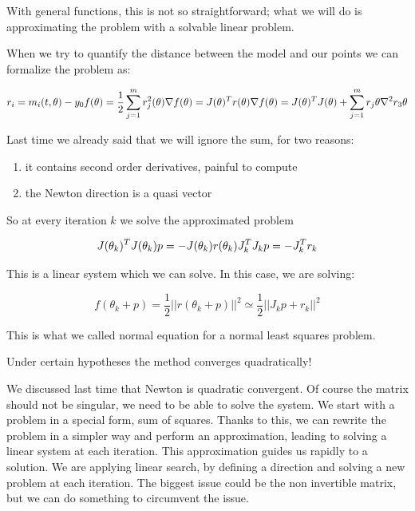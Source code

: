 With general functions, this is not so straightforward; what we will do
is approximating the problem with a solvable linear problem.


When we try to quantify the distance between the model and our points we can formalize the problem as:

$$
r_i = m_i(t,\theta) - y_0 \\ f(\theta)= \frac{1}{2} \sum^m_{j=1} r_j^2 (\theta) \\ \nabla f(\theta) = J(\theta)^{T} r (\theta) \\ \nabla f(\theta) = J(\theta)^{T} J (\theta) + \sum^m_{j=1} r_j \theta \nabla^2 r_3 \theta\\
$$

Last time we already said that we will ignore the sum, for two reasons:

\begin{enumerate}
\def\labelenumi{\arabic{enumi}.}
\tightlist
\item
  it contains second order derivatives, painful to compute
\item
  the Newton direction is a quasi vector
\end{enumerate}

So at every iteration $k$ we solve the approximated problem

$$
J(\theta_k)^TJ(\theta_k)p=-J(\theta_k)r(\theta_k) \\ J_k^TJ_kp=-J_k^T r_k
$$

This is a linear system which we can solve. In this case, we are
solving:

$$
f(\theta_k+p)= \frac{1}{2} ||r(\theta_k+p)||^2 \simeq \frac{1}{2} ||J_kp+r_k||^2
$$

This is what we called normal equation for a normal least squares
problem.

Under certain hypotheses the method converges quadratically!

We discussed last time that Newton is quadratic convergent. Of course
the matrix should not be singular, we need to be able to solve the
system. We start with a problem in a special form, sum of squares.
Thanks to this, we can rewrite the problem in a simpler way and perform
an approximation, leading to solving a linear system at each iteration.
This approximation guides us rapidly to a solution. We are applying
linear search, by defining a direction and solving a new problem at each
iteration. The biggest issue could be the non invertible matrix, but we
can do something to circumvent the issue.

